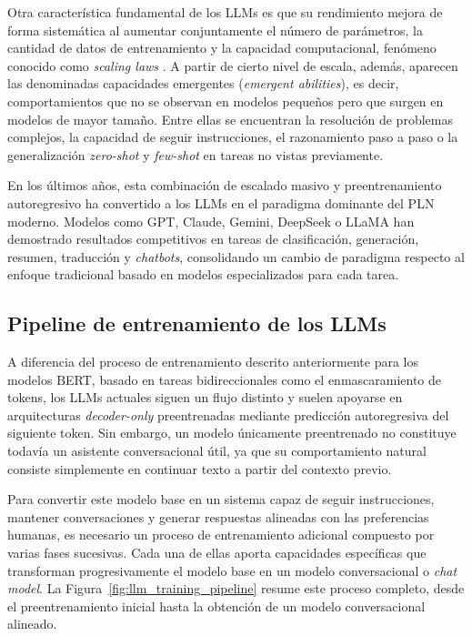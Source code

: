 Otra característica fundamental de los \acp{LLM} es que su rendimiento mejora de forma sistemática al aumentar conjuntamente el número de parámetros, la cantidad de datos de entrenamiento y la capacidad computacional, fenómeno conocido como \textit{scaling laws} \cite{kaplan_scaling_2020}. A partir de cierto nivel de escala, además, aparecen las denominadas capacidades emergentes (\textit{emergent abilities}), es decir, comportamientos que no se observan en modelos pequeños pero que surgen en modelos de mayor tamaño. Entre ellas se encuentran la resolución de problemas complejos, la capacidad de seguir instrucciones, el razonamiento paso a paso o la generalización \textit{zero-shot} y \textit{few-shot} en tareas no vistas previamente.

En los últimos años, esta combinación de escalado masivo y preentrenamiento autoregresivo ha convertido a los \acp{LLM} en el paradigma dominante del \ac{PLN} moderno. Modelos como \ac{GPT}, Claude, Gemini, DeepSeek o LLaMA han demostrado resultados competitivos en tareas de clasificación, generación, resumen, traducción y \textit{chatbots}, consolidando un cambio de paradigma respecto al enfoque tradicional basado en modelos especializados para cada tarea.

\subsection{Pipeline de entrenamiento de los LLMs}

A diferencia del proceso de entrenamiento descrito anteriormente para los modelos \ac{BERT}, basado en tareas bidireccionales como el enmascaramiento de tokens, los \acp{LLM} actuales siguen un flujo distinto y suelen apoyarse en arquitecturas \textit{decoder-only} preentrenadas mediante predicción autoregresiva del siguiente token. Sin embargo, un modelo únicamente preentrenado no constituye todavía un asistente conversacional útil, ya que su comportamiento natural consiste simplemente en continuar texto a partir del contexto previo.

Para convertir este modelo base en un sistema capaz de seguir instrucciones, mantener conversaciones y generar respuestas alineadas con las preferencias humanas, es necesario un proceso de entrenamiento adicional compuesto por varias fases sucesivas. Cada una de ellas aporta capacidades específicas que transforman progresivamente el modelo base en un modelo conversacional o \textit{chat model}. La Figura~\ref{fig:llm_training_pipeline} resume este proceso completo, desde el preentrenamiento inicial hasta la obtención de un modelo conversacional alineado.

